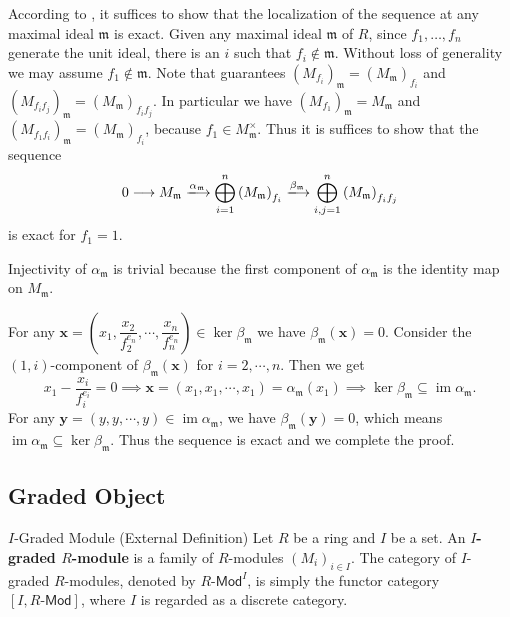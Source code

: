 \begin{prf}
 According to , it suffices to show that the localization of the sequence at any maximal ideal $\mathfrak{m}$ is exact. Given any maximal ideal $\mathfrak{m}$ of $R$, since $f_1, \ldots, f_n$ generate the unit ideal, there is an $i$ such that $f_i \notin \mathfrak{m}$. Without loss of generality we may assume $f_1\notin \mathfrak{m}$. Note that  guarantees $\left(M_{f_i}\right)_{\mathfrak{m}}=\left(M_{\mathfrak{m}}\right)_{f_i}$ and $\left(M_{f_i f_j}\right)_{\mathfrak{m}}=\left(M_{\mathfrak{m}}\right)_{f_i f_{j}}$. In particular we have $\left(M_{f_1}\right)_{\mathfrak{m}}=M_{\mathfrak{m}}$ and $\left(M_{f_1 f_i}\right)_{\mathfrak{m}}=\left(M_{\mathfrak{m}}\right)_{f_i}$, because $f_1\in M_{\mathfrak{m}}^{\times}$. Thus it is suffices to show that the sequence
\[
    0 \longrightarrow M_{\mathfrak{m}} \xlongrightarrow{\alpha_{\mathfrak{m}}} \bigoplus_{i=1}^n \left(M_{\mathfrak{m}}\right)_{f_i} \xlongrightarrow{\beta_{\mathfrak{m}}} \bigoplus_{i, j=1}^n \left(M_{\mathfrak{m}}\right)_{f_i f_j}
\]
 is exact for $f_1=1$.

 Injectivity of $\alpha_{\mathfrak{m}}$ is trivial because the first component of $\alpha_{\mathfrak{m}}$ is the identity map on $M_{\mathfrak{m}}$. 

 For any $\mathbf{x}=\left(x_1, \dfrac{x_2}{f_2^{e_n}},\cdots, \dfrac{x_n}{f_n^{e_n}}\right)\in\ker \beta_{\mathfrak{m}}$ we have $\beta_{\mathfrak{m}}(\mathbf{x})=0$. Consider the $(1,i)$-component of $\beta_{\mathfrak{m}}\left(\mathbf{x}\right)$ for $i=2, \cdots, n$. Then we get
 \[
    x_1-\frac{x_i}{f_i^{e_i}}=0\implies \mathbf{x}=\left(x_1,x_1,\cdots,x_1\right)=\alpha_{\mathfrak{m}}\left(x_1\right)\implies \ker \beta_{\mathfrak{m}}\subseteq \operatorname{im}\alpha_{\mathfrak{m}}.
 \]
For any $\mathbf{y}=\left(y, y, \cdots, y\right)\in \operatorname{im}\alpha_{\mathfrak{m}}$, we have $\beta_{\mathfrak{m}}\left(\mathbf{y}\right)=0$, which means $\operatorname{im}\alpha_{\mathfrak{m}}\subseteq \ker \beta_{\mathfrak{m}}$. Thus the sequence is exact and we complete the proof.
\end{prf}


\subsection{Graded Object}

\begin{definition}{$I$-Graded Module (External Definition)}{}    
    Let $R$ be a ring and $I$ be a set. An \textbf{$I$-graded $R$-module} is a family of $R$-modules $\left(M_i\right)_{i\in I}$. The category of $I$-graded $R$-modules, denoted by $R\text{-}\mathsf{Mod}^I$, is simply the functor category $[I, R\text{-}\mathsf{Mod}]$, where $I$ is regarded as a discrete category.
\end{definition}

